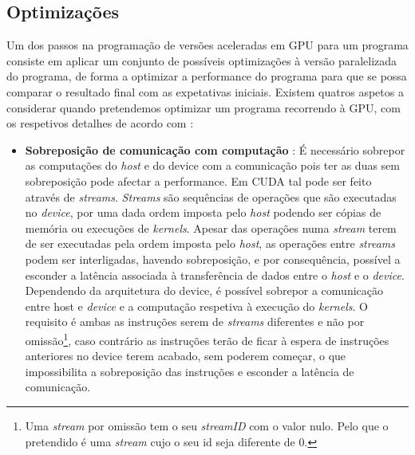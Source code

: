 \subsection{Optimizações}
\label{optmi}
Um dos passos na programação de versões aceleradas em GPU para um programa consiste em aplicar um conjunto de possíveis optimizações à versão paralelizada do programa, de forma a optimizar a performance do programa para que se possa comparar o resultado final com as expetativas iniciais.
Existem quatros aspetos a considerar quando pretendemos optimizar um programa recorrendo à GPU, com os respetivos detalhes de acordo com \cite{cudaProgGuide}:
\begin{itemize}
\item{\textbf{Sobreposição de comunicação com computação}} : 
É necessário sobrepor as computações do \textit{host} e do device com a comunicação pois ter as duas sem sobreposição pode afectar a performance. Em CUDA tal pode ser feito através de \textit{streams}. \textit{Streams} são sequências de operações que são executadas no \textit{device}, por uma dada ordem imposta pelo \textit{host}  podendo ser cópias de memória ou execuções de \textit{kernels}. Apesar das operações numa \textit{stream} terem de ser executadas pela ordem imposta pelo \textit{host}, as operações entre \textit{streams} podem ser interligadas, havendo sobreposição, e por consequência, possível a esconder a latência associada à transferência de dados entre o \textit{host} e o \textit{device}. Dependendo da arquitetura do device, é possível sobrepor a comunicação entre host e \textit{device} e a computação respetiva à execução do \textit{kernels}. O requisito é ambas as instruções serem de \textit{streams} diferentes e não por omissão\footnote[2]{Uma \textit{stream} por omissão tem o seu \textit{streamID} com o valor nulo. Pelo que o pretendido é uma \textit{stream} cujo o seu id seja diferente de 0. }, caso contrário as instruções terão de ficar à espera de instruções anteriores no device terem acabado, sem poderem começar, o que  impossibilita a sobreposição das instruções e esconder a latência de comunicação.


\end{itemize}
